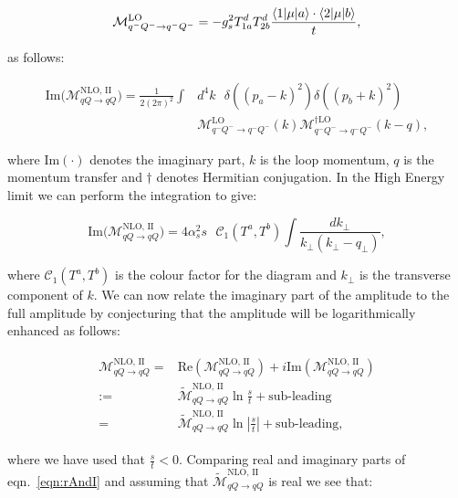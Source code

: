 		\begin{equation}
			\mathcal{M}_{q^-Q^-\rightarrow q^-Q^-}^{\text{LO}} =
			-g_s^2T^d_{1a}T^d_{2b}\frac{\langle 1 | \mu | a \rangle\cdot\langle 2 | \mu | b \rangle}{t},
		\end{equation}

		as follows:

		\begin{align}
			\text{Im}\Big(\mathcal{M}_{qQ\rightarrow qQ}^{\text{NLO, II}}\Big) =
			\frac{1}{2(2\pi)^2}\int &d^4k\text{ }\delta((p_a-k)^2)
			\delta((p_b+k)^2)\\ &\mathcal{M}_{q^-Q^-\rightarrow q^-Q^-}^{\text{LO}}(k)
			\mathcal{M}_{q^-Q^-\rightarrow q^-Q^-}^{\dagger\text{LO}}(k-q),
		\end{align}

		where $\text{Im}(\cdot)$ denotes the imaginary part, $k$ is the loop momentum, $q$ is the momentum
		transfer and $\dagger$ denotes Hermitian conjugation.  In the High Energy limit we can perform the
		integration to give:

		\begin{equation}
			\text{Im}\Big(\mathcal{M}_{qQ\rightarrow qQ}^{\text{NLO, II}}\Big) =
			4\alpha_s^2 s\text{ }\mathcal{C}_1(T^a,T^b)
			\int \frac{dk_{\perp}}{k_{\perp}(k_{\perp} - q_{\perp})},
		\end{equation}

		where $\mathcal{C}_1(T^a,T^b)$ is the colour factor for the diagram and $k_{\perp}$ is the transverse
		component of $k$.  We can now relate the imaginary part of the amplitude to the full amplitude by
		conjecturing that the amplitude will be logarithmically enhanced as follows:

		\begin{align}
		\begin{split}
			\mathcal{M}_{qQ\rightarrow qQ}^{\text{NLO, II}} =
			&\text{Re}(\mathcal{M}_{qQ\rightarrow qQ}^{\text{NLO, II}}) +
			i\text{Im}(\mathcal{M}_{qQ\rightarrow qQ}^{\text{NLO, II}})\\
			:=&\widetilde{\mathcal{M}}_{qQ\rightarrow qQ}^{\text{NLO, II}}\ln\frac{s}{t} + \text{sub-leading}\\
			=&\widetilde{\mathcal{M}}_{qQ\rightarrow qQ}^{\text{NLO, II}}
			\ln\left|\frac{s}{t}\right| + \text{sub-leading},
			\label{eqn:rAndI}
		\end{split}
		\end{align}

		where we have used that $\frac{s}{t} < 0$.  Comparing real and imaginary parts of eqn.~\eqref{eqn:rAndI}
		and assuming that $\widetilde{\mathcal{M}}_{qQ\rightarrow qQ}^{\text{NLO, II}}$ is real we see that:

